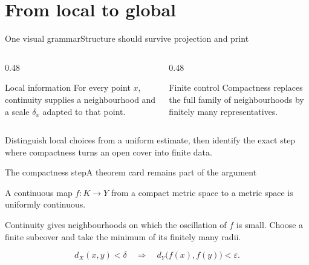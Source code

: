 \documentclass[11pt,aspectratio=169]{beamer}
\begin{document}
\SynapticMakeTitle

\section{From local to global}
\SynapticSectionFrame

\begin{frame}{One visual grammar}{Structure should survive projection and print}
  \begin{columns}[T,onlytextwidth]
    \begin{column}{0.48\textwidth}
      \begin{block}{Local information}
        For every point $x$, continuity supplies a neighbourhood and a scale
        $\delta_x$ adapted to that point.
      \end{block}
    \end{column}
    \begin{column}{0.48\textwidth}
      \begin{exampleblock}{Finite control}
        Compactness replaces the full family of neighbourhoods by finitely
        many representatives.
      \end{exampleblock}
    \end{column}
  \end{columns}

  \vspace{0.8ex}
  \begin{synlearninggoals}
    Distinguish local choices from a uniform estimate, then identify the exact
    step where compactness turns an open cover into finite data.
  \end{synlearninggoals}
\end{frame}

\begin{frame}{The compactness step}{A theorem card remains part of the argument}
  \begin{syntheorem}
    A continuous map $f\colon K\to Y$ from a compact metric space to a metric
    space is uniformly continuous.
  \end{syntheorem}

  \begin{synproof}
    Continuity gives neighbourhoods on which the oscillation of $f$ is small.
    Choose a finite subcover and take the minimum of its finitely many radii.
  \end{synproof}

  \[
    d_X(x,y)<\delta \quad\Longrightarrow\quad
    d_Y\bigl(f(x),f(y)\bigr)<\varepsilon .
  \]
\end{frame}
\end{document}
